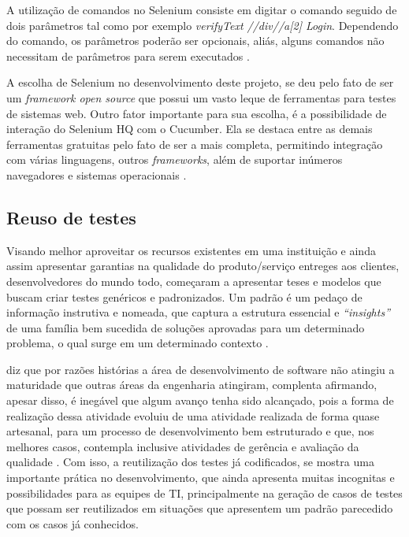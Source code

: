\documentclass[12pt]{article}
\begin{document}
	A  utilização  de  comandos  no  Selenium  consiste  em  digitar  o  comando  seguido  de  dois parâmetros  tal  como  por  exemplo \emph{verifyText //div//a[2] Login}. Dependendo  do  comando,  os parâmetros poderão ser opcionais, aliás, alguns comandos não necessitam de parâmetros para serem executados \cite{sixpenceautomatizaccao}.

	A escolha de Selenium no desenvolvimento deste projeto, se deu pelo fato de ser um \emph{framework open source} que possui um vasto leque de ferramentas para testes de sistemas web. Outro fator importante para sua escolha, é a possibilidade de interação do Selenium HQ com o Cucumber. Ela  se  destaca  entre  as 
    demais ferramentas  gratuitas pelo fato de ser a mais completa, permitindo integração com várias linguagens,  outros \emph{frameworks}, além de suportar inúmeros navegadores e sistemas operacionais \cite{pereiraestudoselenium}.

	\subsection{Reuso de testes}

	Visando melhor aproveitar os recursos existentes em uma instituição e ainda assim apresentar garantias na qualidade do produto/serviço entreges aos clientes, desenvolvedores do mundo todo, começaram a apresentar teses e modelos que buscam criar testes genéricos e padronizados. Um padrão é um pedaço de informação instrutiva e nomeada, que captura a estrutura essencial e \emph{“insights”} de uma família bem sucedida de soluções aprovadas
	para um determinado problema, o qual surge em um determinado contexto \cite{cagnin2004reuso}. 

	\citeauthor{guizzardi2000desenvolvimento} diz que por razões histórias a área de desenvolvimento de software não atingiu a maturidade que outras áreas da engenharia atingiram, complenta afirmando, apesar disso, é inegável que algum avanço tenha sido alcançado, pois a forma de realização dessa atividade evoluiu de 
    uma atividade realizada de forma quase artesanal, para um processo de desenvolvimento bem estruturado e que, nos melhores casos, contempla inclusive atividades de gerência e avaliação da qualidade \cite{guizzardi2000desenvolvimento}. Com isso, a reutilização dos testes já codificados, se mostra uma importante prática no desenvolvimento, que ainda apresenta muitas incognitas e possibilidades para as equipes de TI, principalmente na geração de casos de testes que possam ser reutilizados em situações que apresentem um padrão parecedido com os casos já conhecidos.
\end{document}
